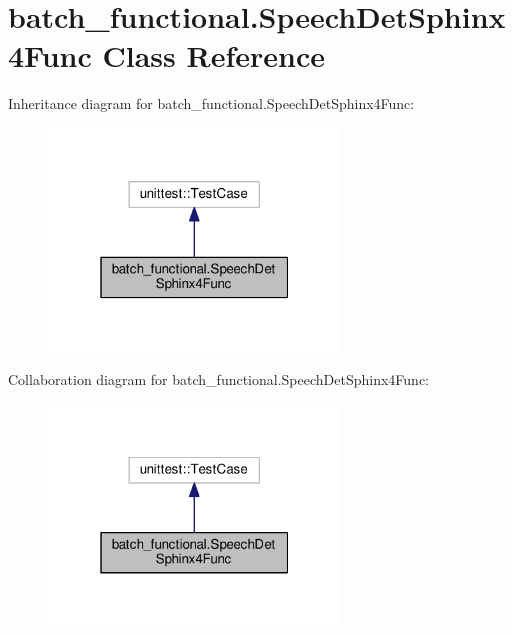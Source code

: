 \hypertarget{classbatch__functional_1_1SpeechDetSphinx4Func}{\section{batch\-\_\-functional.\-Speech\-Det\-Sphinx4\-Func Class Reference}
\label{classbatch__functional_1_1SpeechDetSphinx4Func}
}


Inheritance diagram for batch\-\_\-functional.\-Speech\-Det\-Sphinx4\-Func\-:
\nopagebreak
\begin{figure}[H]
\begin{center}
\leavevmode
\includegraphics[width=220pt]{classbatch__functional_1_1SpeechDetSphinx4Func__inherit__graph}
\end{center}
\end{figure}


Collaboration diagram for batch\-\_\-functional.\-Speech\-Det\-Sphinx4\-Func\-:
\nopagebreak
\begin{figure}[H]
\begin{center}
\leavevmode
\includegraphics[width=220pt]{classbatch__functional_1_1SpeechDetSphinx4Func__coll__graph}
\end{center}
\end{figure}
